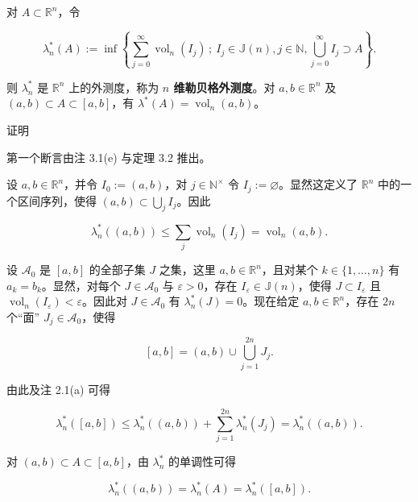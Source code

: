 \begin{proposition}

对 $ A \subset \mathbb{R}^n $，令

\[
\lambda_n^*(A) := \inf\left\{ \sum_{j=0}^{\infty} \operatorname{vol}_n(I_j) \,;\ I_j \in \mathbb{J}(n), j \in \mathbb{N}, \bigcup_{j=0}^{\infty} I_j \supset A \right\} .
\]

则 $ \lambda_n^* $ 是 $ \mathbb{R}^n $ 上的外测度，称为 \textbf{$ n $ 维勒贝格外测度}。对 $ a, b \in \mathbb{R}^n $ 及 $ (a, b) \subset A \subset [a, b] $，有 $ \lambda^*(A) = \operatorname{vol}_n(a,b) $。

证明

\begin{subitems}
\item

第一个断言由注 3.1(e) 与定理 3.2 推出。

\item

设 $ a, b \in \mathbb{R}^n $，并令 $ I_0 := (a, b) $，对 $ j \in \mathbb{N}^{\times} $ 令 $ I_j := \varnothing $。显然这定义了 $ \mathbb{R}^n $ 中的一个区间序列，使得 $ (a, b) \subset \bigcup_j I_j $。因此

\begin{equation}
\lambda_n^*((a,b)) \le \sum_j \operatorname{vol}_n(I_j) = \operatorname{vol}_n(a,b) .\tag{3.1}
\end{equation}
\item

设 $ \mathcal{A}_0 $ 是 $ [a, b] $ 的全部子集 $ J $ 之集，这里 $ a, b \in \mathbb{R}^n $，且对某个 $ k \in \{1, \ldots, n\} $ 有 $ a_k = b_k $。显然，对每个 $ J \in \mathcal{A}_0 $ 与 $ \varepsilon > 0 $，存在 $ I_\varepsilon \in \mathbb{J}(n) $，使得 $ J \subset I_\varepsilon $ 且 $ \operatorname{vol}_n(I_\varepsilon) < \varepsilon $。因此对 $ J \in \mathcal{A}_0 $ 有 $ \lambda_n^*(J) = 0 $。现在给定 $ a, b \in \mathbb{R}^n $，存在 $ 2n $ 个“面” $ J_j \in \mathcal{A}_0 $，使得

\[
[a,b] = (a,b) \cup \bigcup_{j=1}^{2n} J_j .
\]

由此及注 2.1(a) 可得

\[
\lambda_n^*([a,b]) \le \lambda_n^*((a,b)) + \sum_{j=1}^{2n} \lambda_n^*(J_j) = \lambda_n^*((a,b)) .
\]

对 $ (a, b) \subset A \subset [a, b] $，由 $ \lambda_n^* $ 的单调性可得

\begin{equation}
\lambda_n^*((a,b)) = \lambda_n^*(A) = \lambda_n^*([a,b]) .\tag{3.2}
\end{equation}
\item


\end{subitems}
\end{proposition}
